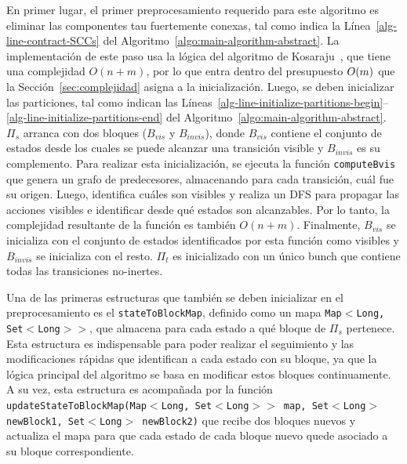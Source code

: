 En primer lugar, el primer preprocesamiento requerido para este algoritmo es eliminar las componentes tau fuertemente conexas, tal como indica la Línea~\ref{alg-line-contract-SCCs} del Algoritmo~\ref{algo:main-algorithm-abstract}. La implementación de este paso usa la lógica del algoritmo de Kosaraju~\cite{sharir1981}, que tiene una complejidad $O(n + m)$, por lo que entra dentro del presupuesto ${O\!\left(m\right)}$ que la Sección~\ref{sec:complejidad} asigna a la inicialización.
Luego, se deben inicializar las particiones, tal como indican las Líneas~\ref{alg-line-initialize-partitions-begin}--\ref{alg-line-initialize-partitions-end} del Algoritmo~\ref{algo:main-algorithm-abstract}. $\Pi_s$ arranca con dos bloques ($B_{vis}$ y $B_{invis}$), donde $B_{vis}$ contiene el conjunto de estados desde los cuales se puede alcanzar una transición visible y $B_{invis}$ es su complemento.
Para realizar esta inicialización, se ejecuta la función \texttt{computeBvis} que genera un grafo de predecesores, almacenando para cada transición, cuál fue su origen. Luego, identifica cuáles son visibles y realiza un DFS para propagar las acciones visibles e identificar desde qué estados son alcanzables. 
Por lo tanto, la complejidad resultante de la función es también $O(n + m)$. Finalmente, $B_{vis}$ se inicializa con el conjunto de estados identificados por esta función como visibles y $B_{invis}$ se inicializa con el resto.
$\Pi_t$ es inicializado con un único bunch que contiene todas las transiciones no-inertes.

Una de las primeras estructuras que también se deben inicializar en el preprocesamiento es el \texttt{stateToBlockMap}, definido como un mapa \texttt{Map$<$Long, Set$<$Long$>$$>$}, que almacena para cada estado a qué bloque de $\Pi_s$ pertenece. Esta estructura es indispensable para poder realizar el seguimiento y las modificaciones rápidas que identifican a cada estado con su bloque, ya que la lógica principal del algoritmo se basa en modificar estos bloques continuamente. A su vez, esta estructura es acompañada por la función \texttt{updateStateToBlockMap(Map$<$Long, Set$<$Long$>$$>$ map, Set$<$Long$>$ newBlock1, Set$<$Long$>$ newBlock2)} que recibe dos bloques nuevos y actualiza el mapa para que cada estado de cada bloque nuevo quede asociado a su bloque correspondiente. 

